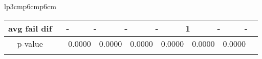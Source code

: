{\begin{tabular}{lp{3cm}p{6cm}p{6cm}}
\begin{tabular}[h]{m{2.5cm}m{}m{}m{}m{}m{}m{}m{}m{}m{}m{}m{}m{}m{}m{}}
\multicolumn{1}{c}{avg fail dif}&\multicolumn{2}{c}{          -}&\multicolumn{2}{c}{      -}&\multicolumn{2}{c}{      -}&\multicolumn{2}{c}{      -}&\multicolumn{2}{c}{      1}&\multicolumn{2}{c}{      -}&\multicolumn{2}{c}{      -}\\
\hline
\multicolumn{1}{c}{p-value}&&\multicolumn{2}{c}{0.0000}&\multicolumn{2}{c}{0.0000}&\multicolumn{2}{c}{0.0000}&\multicolumn{2}{c}{0.0000}&\multicolumn{2}{c}{0.0000}&\multicolumn{2}{c}{0.0000}\\
&&&&&&&&&&&&&&\end{tabular}
\end{tabular}
}
